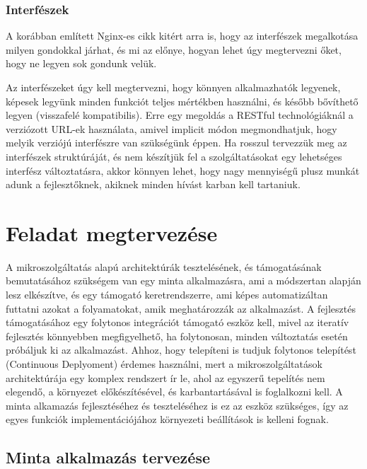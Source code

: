 \documentclass[11pt,magyar,a4paper,twoside,]{report}
\begin{document}
\subsection{Interfészek}\label{interfuxe9szek}

A korábban említett Nginx-es cikk kitért arra is, hogy az interfészek
megalkotása milyen gondokkal járhat, és mi az előnye, hogyan lehet úgy
megtervezni őket, hogy ne legyen sok gondunk velük.

Az interfészeket úgy kell megtervezni, hogy könnyen alkalmazhatók
legyenek, képesek legyünk minden funkciót teljes mértékben használni, és
később bővíthető legyen (visszafelé kompatibilis). Erre egy megoldás a
RESTful technológiáknál a verziózott URL-ek használata, amivel implicit
módon megmondhatjuk, hogy melyik verziójú interfészre van szükségünk
éppen. Ha rosszul tervezzük meg az interfészek struktúráját, és nem
készítjük fel a szolgáltatásokat egy lehetséges interfész változtatásra,
akkor könnyen lehet, hogy nagy mennyiségű plusz munkát adunk a
fejlesztőknek, akiknek minden hívást karban kell tartaniuk.

\chapter{Feladat megtervezése}\label{feladat-megtervezuxe9se}

A mikroszolgáltatás alapú architektúrák tesztelésének, és támogatásának
bemutatásához szükségem van egy minta alkalmazásra, ami a módszertan
alapján lesz elkészítve, és egy támogató keretrendszerre, ami képes
automatizáltan futtatni azokat a folyamatokat, amik meghatározzák az
alkalmazást. A fejlesztés támogatásához egy folytonos integrációt
támogató eszköz kell, mivel az iteratív fejlesztés könnyebben
megfigyelhető, ha folytonosan, minden változtatás esetén próbáljuk ki az
alkalmazást. Ahhoz, hogy telepíteni is tudjuk folytonos telepítést
(Continuous Deplyoment) érdemes használni, mert a mikroszolgáltatások
architektúrája egy komplex rendszert ír le, ahol az egyszerű tepelítés
nem elegendő, a környezet előkészítésével, és karbantartásával is
foglalkozni kell. A minta alkamazás fejlesztéséhez és teszteléséhez is
ez az eszköz szükséges, így az egyes funkciók implementációjához
környezeti beállítások is kelleni fognak.

\section{Minta alkalmazás
tervezése}\label{minta-alkalmazuxe1s-tervezuxe9se}
\end{document}
